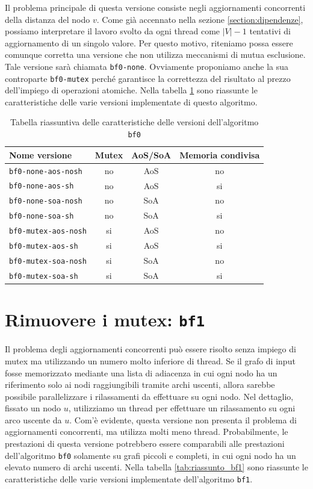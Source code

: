 \documentclass[12pt,a4paper,oneside]{book}
\begin{document}
	Il problema principale di questa versione consiste negli aggiornamenti concorrenti della distanza del nodo $v$. Come già accennato nella sezione \ref{section:dipendenze}, possiamo interpretare il lavoro svolto da ogni thread come $|V|-1$ tentativi di aggiornamento di un singolo valore. Per questo motivo, riteniamo possa essere comunque corretta una versione che non utilizza meccanismi di mutua esclusione. Tale versione sarà chiamata \texttt{bf0-none}. Ovviamente proponiamo anche la sua controparte \texttt{bf0-mutex} perché garantisce la correttezza del risultato al prezzo dell'impiego di operazioni atomiche. Nella tabella \ref{tab:riassunto_bf0} sono riassunte le caratteristiche delle varie versioni implementate di questo algoritmo.
	
	\begin{table}[!ht]
		\centering
		\begin{tabular}{|l|c|c|c|}
			\hline
			\textbf{Nome versione} & \textbf{Mutex} & \textbf{AoS/SoA} & \textbf{Memoria condivisa} \\ \hline
			\texttt{bf0-none-aos-nosh}  & no & AoS & no \\ \hline
			\texttt{bf0-none-aos-sh}    & no & AoS & si \\ \hline
			\texttt{bf0-none-soa-nosh}  & no & SoA & no \\ \hline
			\texttt{bf0-none-soa-sh}    & no & SoA & si \\ \hline
			\texttt{bf0-mutex-aos-nosh} & si & AoS & no \\ \hline
			\texttt{bf0-mutex-aos-sh}   & si & AoS & si \\ \hline
			\texttt{bf0-mutex-soa-nosh} & si & SoA & no \\ \hline
			\texttt{bf0-mutex-soa-sh}   & si & SoA & si \\ \hline
		\end{tabular}
		\caption{Tabella riassuntiva delle caratteristiche delle versioni dell'algoritmo \texttt{bf0}}
		\label{tab:riassunto_bf0}
	\end{table}
	
	\section{Rimuovere i mutex: \texttt{bf1}}
	\label{section:intro-bf1}
	Il problema degli aggiornamenti concorrenti può essere risolto senza impiego di mutex ma utilizzando un numero molto inferiore di thread. Se il grafo di input fosse memorizzato mediante una lista di adiacenza in cui ogni nodo ha un riferimento solo ai nodi raggiungibili tramite archi uscenti, allora sarebbe possibile parallelizzare i rilassamenti da effettuare su ogni nodo. Nel dettaglio, fissato un nodo $u$, utilizziamo un thread per effettuare un rilassamento su ogni arco uscente da $u$. Com'è evidente, questa versione non presenta il problema di aggiornamenti concorrenti, ma utilizza molti meno thread. Probabilmente, le prestazioni di questa versione potrebbero essere comparabili alle prestazioni dell'algoritmo \texttt{bf0} solamente su grafi piccoli e completi, in cui ogni nodo ha un elevato numero di archi uscenti. Nella tabella \ref{tab:riassunto_bf1} sono riassunte le caratteristiche delle varie versioni implementate dell'algoritmo \texttt{bf1}.
	
\end{document}
